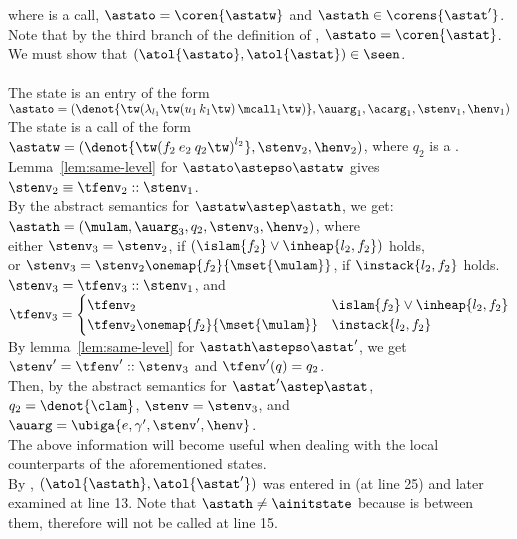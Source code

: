 \documentclass{LMCS}
\theoremstyle{definition} \newtheorem{property}[thm]{Property}
\begin{document}
\begin{enumerate}[$\bullet$]
\begin{enumerate}[$\bullet$]
    where \astatw{} is a call, $\astato = \coren{\astatw}$
    and $\astath \in \corens{\astat'}$. 
    Note that by the third branch of the definition of \dcoren{},
    $\astato = \coren{\astat}$.
    We must show that $(\atol{\astato}, \atol{\astat}) \in \seen$. 
    \\ \\
    The state \astato{} is an entry of the form 
    $\astato = (\denot{\ulamone}, \auarg_1, \acarg_1, 
    \stenv_1, \henv_1)$ \\
    The state \astatw{} is a call of the form 
    $\astatw = (\denot{\ucalltwo}, \stenv_2, \henv_2)$,
    where $q_2$ is a \mclam{}. \\
    Lemma~\ref{lem:same-level} for $\astato \astepso \astatw$ gives
    $\stenv_2 \equiv \tfenv_2::\stenv_1$.\\
    By the abstract semantics for $\astatw \astep \astath$, we get:\\
    $\astath = (\mulam, \auarg_3, q_2, \stenv_3, \henv_2)$, where 
\\
    either $\stenv_3=\stenv_2$, if $(\islam{f_2}\lor\inheap{l_2, f_2})$ holds,\\
    or $\stenv_3 = \stenv_2\onemap{f_2}{\mset{\mulam}}$,
    if $\instack{l_2, f_2}$ holds. \\
    \ie{} $\stenv_3 = \tfenv_3::\stenv_1$, and \\
    $\tfenv_3 = 
    \begin{cases}
      \tfenv_2 & \islam{f_2} \lor \inheap{l_2, f_2} \\
      \tfenv_2\onemap{f_2}{\mset{\mulam}} & \instack{l_2, f_2}
    \end{cases}$ \\
    By lemma~\ref{lem:same-level} for $\astath \astepso \astat'$, 
    we get $\stenv' = \tfenv'::\stenv_3$ and $\tfenv'(q) = q_2$. \\
    Then, by the abstract semantics for $\astat' \astep \astat$, \\
    $q_2 = \denot{\clam}$, $\stenv = \stenv_3$, and 
    $\auarg = \ubiga{e, \gamma', \stenv', \henv}$. \\
    The above information will become useful when dealing with the local
    counterparts of the aforementioned states. 
    \\
    By \ih{}, $(\atol{\astath}, \atol{\astat'})$ was entered in \work{}
    (at line 25) and later examined at line 13.
    Note that $\astath \neq \ainitstate$ because \astatw{} is between them,
    therefore  will not be called at line 15. 

\end{enumerate}
\end{enumerate}
\end{document}
